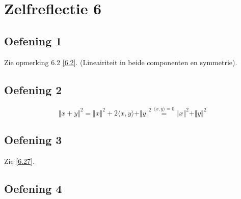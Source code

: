 \documentclass[lineaire_algebra_oplossingen.tex]{subfiles}
\begin{document}
\section{Zelfreflectie 6}
\subsection{Oefening 1}
Zie opmerking 6.2 \ref{6.2}. (Lineairiteit in beide componenten en symmetrie).

\subsection{Oefening 2}
\[
\Vert x+y \Vert^2 = \Vert x\Vert^2 + 2\langle x,y \rangle+ \Vert y\Vert^2 \overset{\langle x,y \rangle = 0}{=}\Vert x\Vert^2 + \Vert y\Vert^2
\]

\subsection{Oefening 3}
Zie \ref{6.27}.

\subsection{Oefening 4}
\end{document}
